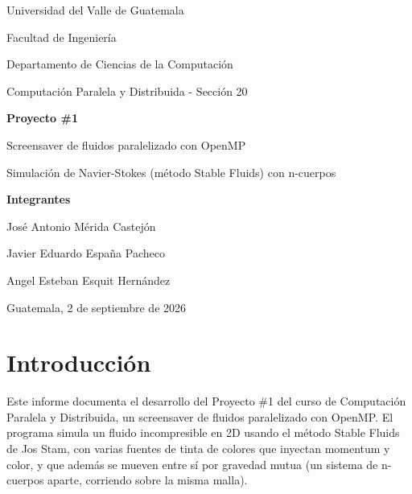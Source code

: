 \documentclass[11pt]{article}
\begin{document}
\begin{titlepage}
    \centering
    \vspace*{1cm}

    {\large Universidad del Valle de Guatemala\par}
    {\large Facultad de Ingeniería\par}
    {\large Departamento de Ciencias de la Computación\par}
    {\large Computación Paralela y Distribuida - Sección 20\par}
    \vspace{0.3cm}

    \vspace{3cm}

    {\Huge\bfseries Proyecto \#1\par}
    \vspace{0.5cm}
    {\Large Screensaver de fluidos paralelizado con OpenMP\par}
    \vspace{0.3cm}
    {\large Simulación de Navier-Stokes (método Stable Fluids) con n-cuerpos\par}

    \vspace{3cm}

    {\large\bfseries Integrantes\par}
    \vspace{0.3cm}
    {\large José Antonio Mérida Castejón\par}
    {\large Javier Eduardo España Pacheco\par}
    {\large Angel Esteban Esquit Hernández\par}

    \vfill

    {\large Guatemala, 2 de septiembre de 2026\par}
\end{titlepage}

\tableofcontents
\clearpage

\section{Introducción}

Este informe documenta el desarrollo del Proyecto \#1 del curso de
Computación Paralela y Distribuida, un screensaver de fluidos
paralelizado con OpenMP. El programa simula un fluido incompresible en
2D usando el método Stable Fluids de Jos Stam, con varias fuentes de
tinta de colores que inyectan momentum y color, y que además se mueven
entre sí por gravedad mutua (un sistema de n-cuerpos aparte, corriendo
sobre la misma malla).
\end{document}
